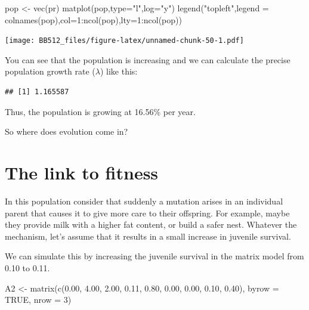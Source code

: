 \documentclass[
  a4paper]{book}
\newenvironment{Shaded}{\begin{snugshade}}{\end{snugshade}}
\newcommand{\AttributeTok}[1]{\textcolor[rgb]{0.77,0.63,0.00}{#1}}
\newcommand{\ConstantTok}[1]{\textcolor[rgb]{0.00,0.00,0.00}{#1}}
\newcommand{\DecValTok}[1]{\textcolor[rgb]{0.00,0.00,0.81}{#1}}
\newcommand{\FloatTok}[1]{\textcolor[rgb]{0.00,0.00,0.81}{#1}}
\newcommand{\FunctionTok}[1]{\textcolor[rgb]{0.00,0.00,0.00}{#1}}
\newcommand{\NormalTok}[1]{#1}
\newcommand{\OtherTok}[1]{\textcolor[rgb]{0.56,0.35,0.01}{#1}}
\newcommand{\SpecialCharTok}[1]{\textcolor[rgb]{0.00,0.00,0.00}{#1}}
\newcommand{\StringTok}[1]{\textcolor[rgb]{0.31,0.60,0.02}{#1}}
\begin{document}
\begin{Shaded}
\begin{Highlighting}[]
\NormalTok{pop }\OtherTok{\textless{}{-}} \FunctionTok{vec}\NormalTok{(pr)}
\FunctionTok{matplot}\NormalTok{(pop,}\AttributeTok{type=}\StringTok{"l"}\NormalTok{,}\AttributeTok{log=}\StringTok{"y"}\NormalTok{)}
\FunctionTok{legend}\NormalTok{(}\StringTok{"topleft"}\NormalTok{,}\AttributeTok{legend =} \FunctionTok{colnames}\NormalTok{(pop),}\AttributeTok{col=}\DecValTok{1}\SpecialCharTok{:}\FunctionTok{ncol}\NormalTok{(pop),}\AttributeTok{lty=}\DecValTok{1}\SpecialCharTok{:}\FunctionTok{ncol}\NormalTok{(pop))}
\end{Highlighting}
\end{Shaded}

\texttt{[image: BB512\_files/figure-latex/unnamed-chunk-50-1.pdf]}

You can see that the population is increasing and we can calculate the
precise population growth rate (\(\lambda\)) like this:

\begin{Shaded}
\end{Shaded}

\begin{verbatim}
## [1] 1.165587
\end{verbatim}

Thus, the population is growing at 16.56\% per year.

So where does evolution come in?

\hypertarget{the-link-to-fitness}{%
\section{The link to fitness}\label{the-link-to-fitness}}

In this population consider that suddenly a mutation arises in an
individual parent that causes it to give more care to their offspring.
For example, maybe they provide milk with a higher fat content, or build
a safer nest. Whatever the mechanism, let's assume that it results in a
small increase in juvenile survival.

We can simulate this by increasing the juvenile survival in the matrix
model from 0.10 to 0.11.

\begin{Shaded}
\begin{Highlighting}[]
\NormalTok{A2 }\OtherTok{\textless{}{-}} \FunctionTok{matrix}\NormalTok{(}\FunctionTok{c}\NormalTok{(}\FloatTok{0.00}\NormalTok{, }\FloatTok{4.00}\NormalTok{, }\FloatTok{2.00}\NormalTok{, }
               \FloatTok{0.11}\NormalTok{, }\FloatTok{0.80}\NormalTok{, }\FloatTok{0.00}\NormalTok{, }
               \FloatTok{0.00}\NormalTok{, }\FloatTok{0.10}\NormalTok{, }\FloatTok{0.40}\NormalTok{), }
            \AttributeTok{byrow =} \ConstantTok{TRUE}\NormalTok{, }\AttributeTok{nrow =} \DecValTok{3}\NormalTok{)}
\end{Highlighting}
\end{Shaded}
\end{document}
